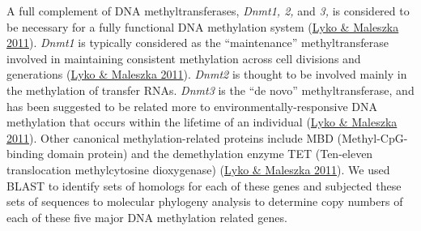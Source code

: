\documentclass[]{article}
\begin{document}
A full complement of DNA methyltransferases, \emph{Dnmt1, 2,} and
\emph{3,} is considered to be necessary for a fully functional DNA
methylation system (\protect\hyperlink{ux5fENREFux5f34}{Lyko \& Maleszka
2011}). \emph{Dnmt1} is typically considered as the ``maintenance''
methyltransferase involved in maintaining consistent methylation across
cell divisions and generations (\protect\hyperlink{ux5fENREFux5f34}{Lyko
\& Maleszka 2011}). \emph{Dnmt2} is thought to be involved mainly in the
methylation of transfer RNAs. \emph{Dnmt3} is the ``de novo''
methyltransferase, and has been suggested to be related more to
environmentally-responsive DNA methylation that occurs within the
lifetime of an individual (\protect\hyperlink{ux5fENREFux5f34}{Lyko \&
Maleszka 2011}). Other canonical methylation-related proteins include
MBD (Methyl-CpG-binding domain protein) and the demethylation enzyme TET
(Ten-eleven translocation methylcytosine dioxygenase)
(\protect\hyperlink{ux5fENREFux5f34}{Lyko \& Maleszka 2011}). We used
BLAST to identify sets of homologs for each of these genes and subjected
these sets of sequences to molecular phylogeny analysis to determine
copy numbers of each of these five major DNA methylation related genes.
\end{document}
